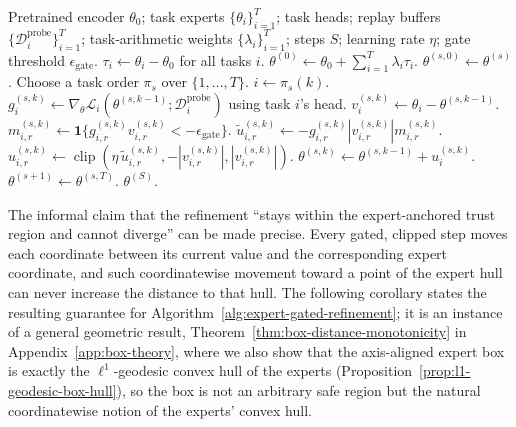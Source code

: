 \documentclass[11pt]{article}
\newcommand{\thetab}{\theta_0}
\newcommand{\taskvec}{\tau}
\newcommand{\loss}{\mathcal{L}}
\newcommand{\data}{\mathcal{D}}
\newcommand{\ind}{\mathbf{1}}
\DeclareMathOperator{\clip}{clip}
\begin{document}
\begin{algorithm}[H]
\caption{Sequential expert-direction-gated replay refinement}
\label{alg:expert-gated-refinement}
\begin{algorithmic}[1]
\REQUIRE Pretrained encoder $\thetab$; task experts $\{\theta_i\}_{i=1}^T$; task heads; replay buffers $\{\data_i^{\mathrm{probe}}\}_{i=1}^T$; task-arithmetic weights $\{\lambda_i\}_{i=1}^T$; steps $S$; learning rate $\eta$; gate threshold $\epsilon_{\mathrm{gate}}$.
\STATE $\taskvec_i \gets \theta_i-\thetab$ for all tasks $i$.
\STATE $\theta^{(0)} \gets \thetab + \sum_{i=1}^{T}\lambda_i\taskvec_i$. 
    \STATE $\theta^{(s,0)} \gets \theta^{(s)}$.
    \STATE Choose a task order $\pi_s$ over $\{1,\ldots,T\}$.
        \STATE $i \gets \pi_s(k)$.
        \STATE $g_i^{(s,k)} \gets \nabla_\theta \loss_i(\theta^{(s,k-1)};\data_i^{\mathrm{probe}})$ using task $i$'s head.
        \STATE $v_i^{(s,k)} \gets \theta_i - \theta^{(s,k-1)}$.
            \STATE $m_{i,r}^{(s,k)} \gets \ind\{g_{i,r}^{(s,k)}v_{i,r}^{(s,k)} < -\epsilon_{\mathrm{gate}}\}$.
            \STATE $\widetilde u_{i,r}^{(s,k)} \gets -g_{i,r}^{(s,k)} |v_{i,r}^{(s,k)}| m_{i,r}^{(s,k)}$.
            \STATE $u_{i,r}^{(s,k)} \gets \clip(\eta\,\widetilde u_{i,r}^{(s,k)},- |v_{i,r}^{(s,k)}|, |v_{i,r}^{(s,k)}|)$. 
        \ENDFOR
        \STATE $\theta^{(s,k)} \gets \theta^{(s,k-1)} + u_i^{(s,k)}$.
    \ENDFOR
    \STATE $\theta^{(s+1)} \gets \theta^{(s,T)}$.
\ENDFOR
\STATE \RETURN $\theta^{(S)}$.
\end{algorithmic}
\end{algorithm}

The informal claim that the refinement ``stays within the expert-anchored trust region and cannot diverge'' can be made precise. Every gated, clipped step moves each coordinate between its current value and the corresponding expert coordinate, and such coordinatewise movement toward a point of the expert hull can never increase the distance to that hull. The following corollary states the resulting guarantee for Algorithm~\ref{alg:expert-gated-refinement}; it is an instance of a general geometric result, Theorem~\ref{thm:box-distance-monotonicity} in Appendix~\ref{app:box-theory}, where we also show that the axis-aligned expert box is exactly the $\ell^1$-geodesic convex hull of the experts (Proposition~\ref{prop:l1-geodesic-box-hull}), so the box is not an arbitrary safe region but the natural coordinatewise notion of the experts' convex hull.
\end{document}
